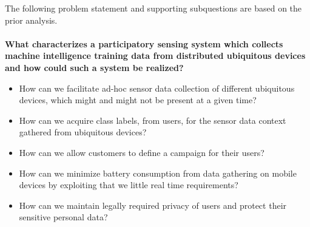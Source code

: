 
The following problem statement and supporting subquestions are based on the prior analysis.
\\\\
\textbf{What characterizes a participatory sensing system which collects machine intelligence training data from distributed ubiquitous devices and how could such a system be realized?}

\begin{itemize}
    \item How can we facilitate ad-hoc sensor data collection of different ubiquitous devices, which might and might not be present at a given time?
    \item How can we acquire class labels, from users, for the sensor data context gathered from ubiquitous devices?  
    \item How can we allow customers to define a campaign for their users?
    \item How can we minimize battery consumption from data gathering on mobile devices by exploiting that we little real time requirements?
    \item How can we maintain legally required privacy of users and protect their sensitive personal data? 
\end{itemize}

